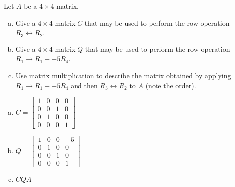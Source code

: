 
\begin{exerciseStatement}


Let \(A\) be a \(4 \times 4\) matrix.


\begin{enumerate}[(a)]
\item Give a \(4 \times 4\) matrix \(C\) that may be used to perform the row operation \( R_3 \leftrightarrow R_2 \).
\item Give a \(4 \times 4\) matrix \(Q\) that may be used to perform the row operation \( R_1 \to R_1 + -5R_4 \).
\item Use matrix multiplication to describe the matrix obtained by applying \( R_1 \to R_1 + -5R_4 \) and then \( R_3 \leftrightarrow R_2 \) to \(A\) (note the order). 
\end{enumerate}
    
\end{exerciseStatement}
    
\begin{exerciseAnswer} 

\begin{enumerate}[(a)]
\item \(C= \left[\begin{array}{cccc}
1 & 0 & 0 & 0 \\
0 & 0 & 1 & 0 \\
0 & 1 & 0 & 0 \\
0 & 0 & 0 & 1
\end{array}\right] \)
\item \(Q= \left[\begin{array}{cccc}
1 & 0 & 0 & -5 \\
0 & 1 & 0 & 0 \\
0 & 0 & 1 & 0 \\
0 & 0 & 0 & 1
\end{array}\right] \)
\item \(CQA\)
\end{enumerate}
    
\end{exerciseAnswer}
    
